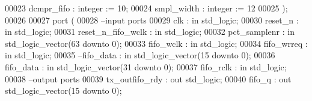 \begin{DoxyCode}
00023             \textcolor{vhdlchar}{dcmpr_fifo}  \textcolor{vhdlchar}{:} \textcolor{comment}{integer} \textcolor{vhdlchar}{:=} \textcolor{vhdllogic}{}\textcolor{vhdllogic}{10};
00024             \textcolor{vhdlchar}{smpl_width}  \textcolor{vhdlchar}{:} \textcolor{comment}{integer} \textcolor{vhdlchar}{:=} \textcolor{vhdllogic}{}\textcolor{vhdllogic}{12}  
00025           \textcolor{vhdlchar}{)};
00026   
00027   \textcolor{keywordflow}{port} \textcolor{vhdlchar}{(}
00028 \textcolor{keyword}{        --input ports }
00029         \textcolor{vhdlchar}{clk}                 \textcolor{vhdlchar}{:} \textcolor{keywordflow}{in} \textcolor{comment}{std\_logic};
00030         \textcolor{vhdlchar}{reset_n}             \textcolor{vhdlchar}{:} \textcolor{keywordflow}{in} \textcolor{comment}{std\_logic};
00031           \textcolor{vhdlchar}{reset_n_fifo_wclk} \textcolor{vhdlchar}{:} \textcolor{keywordflow}{in} \textcolor{comment}{std\_logic};
00032         \textcolor{vhdlchar}{pct_samplenr}        \textcolor{vhdlchar}{:} \textcolor{keywordflow}{in} \textcolor{comment}{std\_logic\_vector}\textcolor{vhdlchar}{(}\textcolor{vhdllogic}{}\textcolor{vhdllogic}{63} \textcolor{keywordflow}{downto} \textcolor{vhdllogic}{}\textcolor{vhdllogic}{0}\textcolor{vhdlchar}{)};
00033         \textcolor{vhdlchar}{fifo_wclk}           \textcolor{vhdlchar}{:} \textcolor{keywordflow}{in} \textcolor{comment}{std\_logic};
00034         \textcolor{vhdlchar}{fifo_wrreq}          \textcolor{vhdlchar}{:} \textcolor{keywordflow}{in} \textcolor{comment}{std\_logic};
00035 \textcolor{keyword}{        --fifo\_data     : in std\_logic\_vector(15 downto 0);}
00036           \textcolor{vhdlchar}{fifo_data}             \textcolor{vhdlchar}{:} \textcolor{keywordflow}{in} \textcolor{comment}{std\_logic\_vector}\textcolor{vhdlchar}{(}\textcolor{vhdllogic}{}\textcolor{vhdllogic}{31} \textcolor{keywordflow}{downto} \textcolor{vhdllogic}{}\textcolor{vhdllogic}{0}\textcolor{vhdlchar}{)};
00037         \textcolor{vhdlchar}{fifo_rclk}           \textcolor{vhdlchar}{:} \textcolor{keywordflow}{in} \textcolor{comment}{std\_logic};
00038 \textcolor{keyword}{        --output ports }
00039         \textcolor{vhdlchar}{tx_outfifo_rdy}  \textcolor{vhdlchar}{:} \textcolor{keywordflow}{out} \textcolor{comment}{std\_logic};
00040         \textcolor{vhdlchar}{fifo_q}          \textcolor{vhdlchar}{:} \textcolor{keywordflow}{out} \textcolor{comment}{std\_logic\_vector}\textcolor{vhdlchar}{(}\textcolor{vhdllogic}{}\textcolor{vhdllogic}{15} \textcolor{keywordflow}{downto} \textcolor{vhdllogic}{}\textcolor{vhdllogic}{0}\textcolor{vhdlchar}{)};

\end{DoxyCode}
